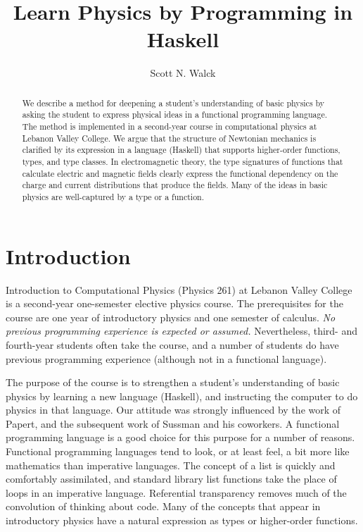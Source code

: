 \documentclass{eptcs}
\title{Learn Physics by Programming in Haskell}
\author{Scott N. Walck
\institute{Department of Physics\\
  Lebanon Valley College\\
  Annville, Pennsylvania, USA}
\email{walck@lvc.edu}
}
\begin{document}
\maketitle

\begin{abstract}

We describe a method for deepening a student's understanding
of basic physics by asking the student to express physical ideas
in a functional programming language.
The method is implemented in a second-year course in computational
physics at Lebanon Valley College.
We argue that the structure of Newtonian mechanics is clarified by its expression in
a language (Haskell) that supports higher-order functions, types, and
type classes.
In electromagnetic theory, the type signatures of functions that calculate
electric and magnetic fields clearly express the functional dependency
on the charge and current distributions that produce the fields.
Many of the ideas in basic physics are well-captured by a type
or a function.

\end{abstract}

\section{Introduction}

Introduction to Computational Physics (Physics 261) at Lebanon Valley College
is a second-year one-semester elective physics course.  The prerequisites for the course
are one year of introductory physics and one semester of calculus.
\emph{No previous programming experience is expected or assumed.}
Nevertheless, third- and fourth-year students often take the course, and
a number of students do have previous programming experience (although
not in a functional language).

The purpose of the course is to strengthen a student's understanding of basic
physics by learning a new language (Haskell), and instructing the computer
to do physics in that language.
Our attitude was strongly influenced by the work of Papert\cite{papert},
and the subsequent work of Sussman and his coworkers\cite{sicm,sussmanFDG}.
A functional programming language is a good choice for this purpose for a number
of reasons.  Functional programming languages tend to look, or at least feel,
a bit more like mathematics than imperative languages.  The concept
of a list is quickly and comfortably assimilated, and standard library list
functions take the place of loops in an imperative language.
Referential transparency removes much of the convolution
of thinking
about code.  Many of the concepts that appear in introductory physics
have a natural expression as types or higher-order functions.
\end{document}
